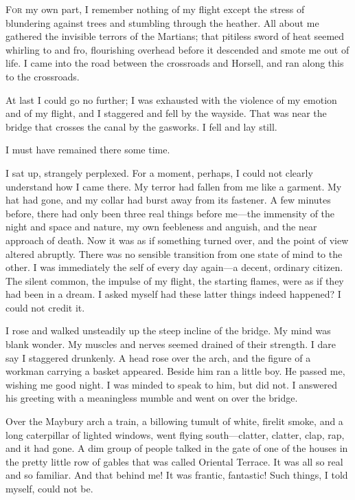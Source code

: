 


\lettrine[lines=4]{F}{or} my own part, I remember nothing of my flight except the stress of blundering against trees and stumbling through the heather. All about me gathered the invisible terrors of the Martians; that pitiless sword of heat seemed whirling to and fro, flourishing overhead before it descended and smote me out of life. I came into the road between the crossroads and Horsell, and ran along this to the crossroads.

At last I could go no further; I was exhausted with the violence of my emotion and of my flight, and I staggered and fell by the wayside. That was near the bridge that crosses the canal by the gasworks. I fell and lay still.

I must have remained there some time.

I sat up, strangely perplexed. For a moment, perhaps, I could not clearly understand how I came there. My terror had fallen from me like a garment. My hat had gone, and my collar had burst away from its fastener. A few minutes before, there had only been three real things before me—the immensity of the night and space and nature, my own feebleness and anguish, and the near approach of death. Now it was as if something turned over, and the point of view altered abruptly. There was no sensible transition from one state of mind to the other. I was immediately the self of every day again—a decent, ordinary citizen. The silent common, the impulse of my flight, the starting flames, were as if they had been in a dream. I asked myself had these latter things indeed happened? I could not credit it.

I rose and walked unsteadily up the steep incline of the bridge. My mind was blank wonder. My muscles and nerves seemed drained of their strength. I dare say I staggered drunkenly. A head rose over the arch, and the figure of a workman carrying a basket appeared. Beside him ran a little boy. He passed me, wishing me good night. I was minded to speak to him, but did not. I answered his greeting with a meaningless mumble and went on over the bridge.

Over the Maybury arch a train, a billowing tumult of white, firelit smoke, and a long caterpillar of lighted windows, went flying south—clatter, clatter, clap, rap, and it had gone. A dim group of people talked in the gate of one of the houses in the pretty little row of gables that was called Oriental Terrace. It was all so real and so familiar. And that behind me! It was frantic, fantastic! Such things, I told myself, could not be.

